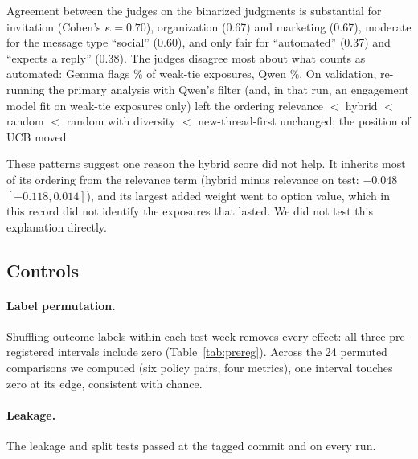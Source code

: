\documentclass[11pt]{article}
\begin{document}
Agreement between the judges on the binarized judgments is substantial for invitation (Cohen's $\kappa = 0.70$), organization (0.67) and marketing (0.67), moderate for the message type ``social'' (0.60), and only fair for ``automated'' (0.37) and ``expects a reply'' (0.38). The judges disagree most about what counts as automated: Gemma flags \gemmaAutoPct\% of weak-tie exposures, Qwen \qwenAutoPct\%. On validation, re-running the primary analysis with Qwen's filter (and, in that run, an engagement model fit on weak-tie exposures only) left the ordering relevance $<$ hybrid $<$ random $<$ random with diversity $<$ new-thread-first unchanged; the position of UCB moved.

These patterns suggest one reason the hybrid score did not help. It inherits most of its ordering from the relevance term (hybrid minus relevance on test: $-0.048$ $[-0.118, 0.014]$), and its largest added weight went to option value, which in this record did not identify the exposures that lasted. We did not test this explanation directly.

\begin{table}[t]
\centering
\small

\caption{Development years (before 2024; \nDevJudged{} weak-tie exposures, \nDevJudgedPos{} later-lasting): mean judged probability, or score for option value, for ordinary and later-lasting exposures with complete outcomes, and each judgment's AUC for the outcome. Both judges ran locally at AnyJev level L0 with zero labels.}
\label{tab:judgments}
\end{table}

\subsection{Controls}

\paragraph{Label permutation.} Shuffling outcome labels within each test week removes every effect: all three pre-registered intervals include zero (Table~\ref{tab:prereg}). Across the 24 permuted comparisons we computed (six policy pairs, four metrics), one interval touches zero at its edge, consistent with chance.

\paragraph{Leakage.} The leakage and split tests passed at the tagged commit and on every run.
\end{document}
